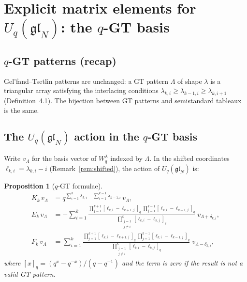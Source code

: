 \documentclass[12pt,a4paper]{article}
\newtheorem{proposition}[theorem]{Proposition}
\theoremstyle{definition}
\theoremstyle{remark}
\newcommand{\gl}{\mathfrak{gl}}
\begin{document}
\section{Explicit matrix elements for $U_q(\gl_N)$: the $q$-GT basis}
\label{sec:q-GT}

\subsection{$q$-GT patterns (recap)}

Gel'fand--Tsetlin patterns are unchanged: a GT pattern $\Lambda$ of
shape $\lambda$ is a triangular array satisfying the interlacing
conditions $\lambda_{k,i} \geqslant \lambda_{k-1,i} \geqslant
\lambda_{k,i+1}$ (Definition~4.1). The bijection between GT patterns
and semistandard tableaux is the same.

\subsection{The $U_q(\gl_N)$ action in the $q$-GT basis}

Write $v_\Lambda$ for the basis vector of $W_q^\lambda$ indexed by
$\Lambda$. In the shifted coordinates $\ell_{k,i} = \lambda_{k,i} - i$
(Remark~\ref{rem:shifted}), the action of $U_q(\gl_N)$ is:

\begin{proposition}[$q$-GT formulae]\label{prop:q-GT}
\begin{align}
  K_k\, v_\Lambda
  &= q^{\sum_{i=1}^k \lambda_{k,i} - \sum_{i=1}^{k-1}
     \lambda_{k-1,i}}\, v_\Lambda,
  \label{eq:q-GT-K} \\[6pt]
  E_k\, v_\Lambda
  &= -\sum_{i=1}^k
    \frac{\displaystyle\prod_{j=1}^{k+1}[\ell_{k,i} - \ell_{k+1,j}]_q
    \;\prod_{j=1}^{k-1}[\ell_{k,i} - \ell_{k-1,j}]_q}
    {\displaystyle\prod_{\substack{j=1 \\ j \neq i}}^{k}
    [\ell_{k,i} - \ell_{k,j}]_q}
    \; v_{\Lambda + \delta_{k,i}},
  \label{eq:q-GT-E} \\[6pt]
  F_k\, v_\Lambda
  &= \sum_{i=1}^k
    \frac{\displaystyle\prod_{j=1}^{k+1}[\ell_{k,i} - \ell_{k+1,j}]_q
    \;\prod_{j=1}^{k-1}[\ell_{k,i} - \ell_{k-1,j}]_q}
    {\displaystyle\prod_{\substack{j=1 \\ j \neq i}}^{k}
    [\ell_{k,i} - \ell_{k,j}]_q}
    \; v_{\Lambda - \delta_{k,i}},
  \label{eq:q-GT-F}
\end{align}
where $[x]_q = (q^x - q^{-x})/(q - q^{-1})$ and the term is zero if
the result is not a valid GT pattern.
\end{proposition}
\end{document}
